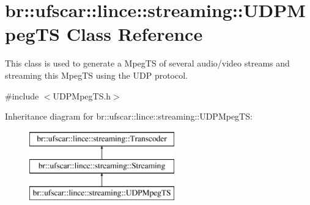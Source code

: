 \hypertarget{classbr_1_1ufscar_1_1lince_1_1streaming_1_1UDPMpegTS}{
\section{br::ufscar::lince::streaming::UDPMpegTS Class Reference}
\label{classbr_1_1ufscar_1_1lince_1_1streaming_1_1UDPMpegTS}
}


This class is used to generate a MpegTS of several audio/video streams and streaming this MpegTS using the UDP protocol.  




{\ttfamily \#include $<$UDPMpegTS.h$>$}

Inheritance diagram for br::ufscar::lince::streaming::UDPMpegTS:\begin{figure}[H]
\begin{center}
\leavevmode
\includegraphics[height=3cm]{classbr_1_1ufscar_1_1lince_1_1streaming_1_1UDPMpegTS}
\end{center}
\end{figure}
